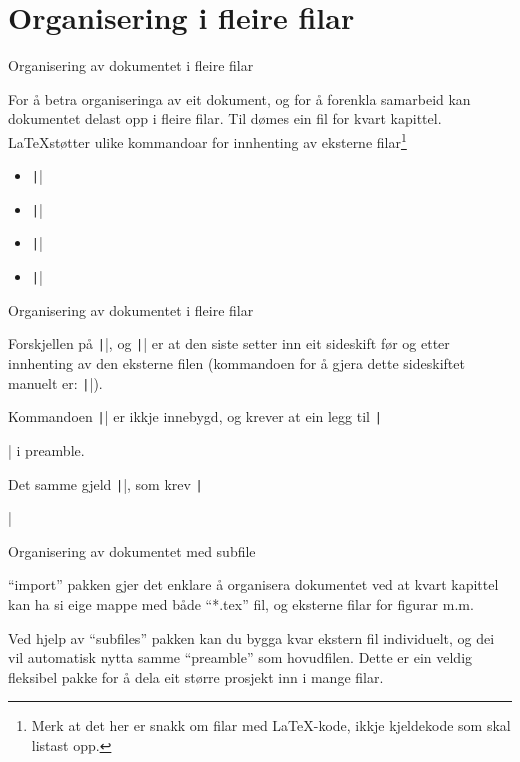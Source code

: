
\section{Organisering i fleire filar}

	\begin{frame}{Organisering av dokumentet i fleire filar}
	
	For å betra organiseringa av eit dokument, og for å forenkla samarbeid kan dokumentet delast opp i fleire filar. Til dømes ein fil for kvart kapittel. \LaTeX støtter ulike kommandoar for innhenting av eksterne filar\footnote{Merk at det her er snakk om filar med \LaTeX-kode, ikkje kjeldekode som skal listast opp.}
	
	\begin{itemize}
		\item \texttt||
		\item \texttt||
		\item \texttt||
		\item \texttt||
	\end{itemize}
	
\end{frame}

\begin{frame}{Organisering av dokumentet i fleire filar}
	
	Forskjellen på \texttt||, og \texttt|| er at den siste setter inn eit sideskift før og etter innhenting av den eksterne filen (kommandoen for å gjera dette sideskiftet manuelt er: \texttt|\clearpage|).
	
	Kommandoen \texttt|| er ikkje innebygd, og krever at ein legg til \texttt|\usepackage{import}| i preamble.
	
	Det samme gjeld \texttt||, som krev \texttt|\usepackage{subfiles}|
	
	
\end{frame}

\begin{frame}{Organisering av dokumentet med subfile}

``import'' pakken gjer det enklare å organisera dokumentet ved at kvart kapittel kan ha si eige mappe med både ``*.tex'' fil, og eksterne filar for figurar m.m.
  
	Ved hjelp av ``subfiles'' pakken kan du bygga kvar ekstern fil individuelt, og dei vil automatisk nytta samme ``preamble'' som hovudfilen. Dette er ein veldig fleksibel pakke for å dela eit større prosjekt inn i mange filar.
	
\end{frame}

